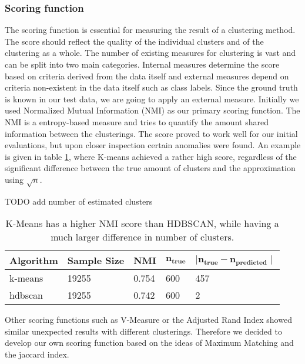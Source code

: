
\subsubsection{Scoring function}

The scoring function is essential for measuring the result of a clustering method. The score should reflect the quality of the individual clusters and of the clustering as a whole. The number of existing measures for clustering is vast and can be split into two main categories. Internal measures determine the score based on criteria derived from the data itself and external measures depend on criteria non-existent in the data itself such as class labels. Since the ground truth is known in our test data, we are going to apply an external measure.   
Initially we used Normalized Mutual Information (NMI) as our primary scoring function. The NMI is a entropy-based measure and tries to quantify the amount shared information between the clusterings. The score proved to work well for our initial evaluations, but upon closer inspection certain anomalies were found. An example is given in table \ref{tab:nmi_kmeans_example}, where K-means achieved a rather high score, regardless of the significant difference between the true amount of clusters and the approximation using $\sqrt{n}$.


TODO add number of estimated clusters
\begin{table}[h]
    \centering
    \begin{tabular}{|l|l|l|l|l|}
    \hline
    \textbf{Algorithm} & \textbf{Sample Size} & \textbf{NMI}  & $\mathbf{n_{true}}$ & $\mathbf{ \mid n_{true} - n_{predicted} \mid }$ \\ \hline
    k-means & 19255 & 0.754 & 600 & 457 \\ \hline
    hdbscan & 19255 & 0.742 & 600 & 2 \\ \hline
    \end{tabular}
    \caption{K-Means has a higher NMI score than HDBSCAN, while having a much larger difference in number of clusters.}
    \label{tab:nmi_kmeans_example}
\end{table}

Other scoring functions such as V-Measure or the Adjusted Rand Index showed similar unexpected results with different clusterings. Therefore we decided to develop our own scoring function based on the ideas of Maximum Matching and the jaccard index. 

